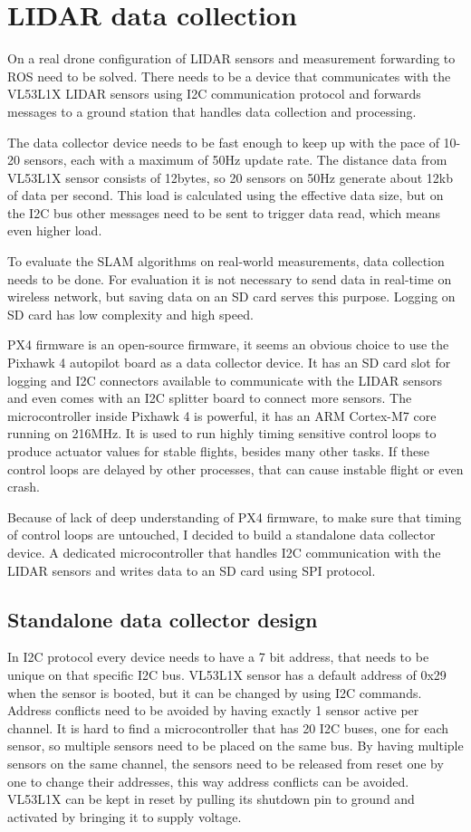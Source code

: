 \section{LIDAR data collection}
On a real drone configuration of LIDAR sensors and measurement forwarding to ROS need to be solved. 
There needs to be a device that communicates with the VL53L1X LIDAR sensors using I2C communication 
protocol and forwards messages to a ground station that handles data collection and processing.

The data collector device needs to be fast enough to keep up with the pace of 10-20 sensors,
each with a maximum of 50Hz update rate. The distance data from VL53L1X sensor consists of 12bytes, 
so 20 sensors on 50Hz generate about 12kb of data per second. This load is calculated using the 
effective data size, but on the I2C bus other messages need to be sent to trigger data read,
which means even higher load.

To evaluate the SLAM algorithms on real-world measurements, data collection needs to be done. 
For evaluation it is not necessary to send data in real-time on wireless network, but saving 
data on an SD card serves this purpose. Logging on SD card has low complexity and high speed. 

PX4 firmware is an open-source firmware, it seems an obvious choice to use the Pixhawk 4 autopilot board 
as a data collector device. It has an SD card slot for logging and I2C connectors available to
communicate with the LIDAR sensors and even comes with an I2C splitter board to connect more sensors.
The microcontroller inside Pixhawk 4 is powerful, it has an ARM Cortex-M7 core running on 216MHz. 
It is used to run highly timing sensitive control loops to produce actuator values for stable flights,
besides many other tasks. If these control loops are delayed by other processes, that can 
cause instable flight or even crash.

Because of lack of deep understanding of PX4 firmware, to make sure that timing of control loops 
are untouched, I decided to build a standalone data collector device. A dedicated microcontroller that
handles I2C communication with the LIDAR sensors and writes data to an SD card using SPI protocol.

\subsection{Standalone data collector design}
In I2C protocol every device needs to have a 7 bit address, that needs to be unique on that specific
I2C bus. VL53L1X sensor has a default address of 0x29 when the sensor is booted, but it can be changed
by using I2C commands. Address conflicts need to be avoided by having exactly 1 sensor active per channel.
It is hard to find a microcontroller that has 20 I2C buses, one for each sensor, so multiple sensors
need to be placed on the same bus. By having multiple sensors on the same channel, the sensors need to 
be released from reset one by one to change their addresses, this way address conflicts can be avoided.
VL53L1X can be kept in reset by pulling its shutdown pin to ground and activated by bringing it to 
supply voltage. 

